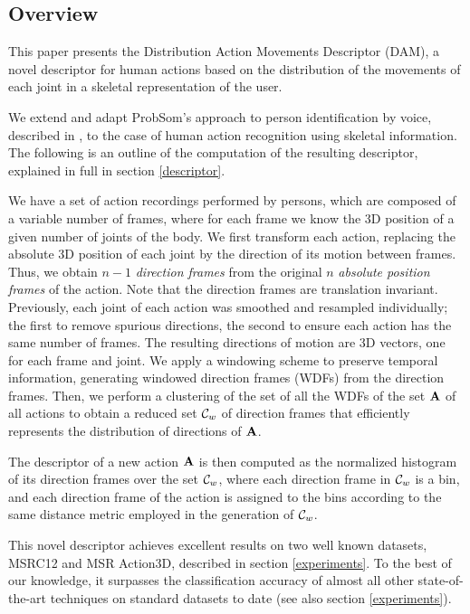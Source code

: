 \documentclass{fcs}
\begin{document}
\subsection{Overview}

This paper presents the Distribution Action Movements Descriptor (DAM), a novel descriptor for human actions based on the distribution of the movements of each joint in a skeletal representation of the user. 

We extend and adapt ProbSom's approach to person identification by voice, described in \cite{Estrebou2010}, to the case of human action recognition using skeletal information. The following is an outline of the computation of the resulting descriptor, explained in full in section \ref{descriptor}. 

We have a set of action recordings performed by persons, which are composed of a variable number of frames, where for each frame we know the 3D position of a given number of joints of the body. We first transform each action, replacing the absolute 3D position of each joint by the direction of its motion between frames. Thus, we obtain $n-1$ \textit{direction frames} from the original $n$ \textit{absolute position frames} of the action. Note that the direction frames are translation invariant. Previously, each joint of each action was smoothed and resampled individually; the first to remove spurious directions, the second to ensure each action has the same number of frames. The resulting directions of motion are 3D vectors, one for each frame and joint. We apply a windowing scheme to preserve temporal information, generating windowed direction frames (WDFs) from the direction frames. Then, we perform a clustering of the set of all the WDFs of the set $\mathbf{A}$ of all actions to obtain a reduced set $\mathcal{C}_w$ of direction frames that efficiently represents the distribution of directions of $\mathbf{A}$. 

The descriptor of a new action $\mathbf{A}$ is then computed as the normalized histogram of its direction frames over the set $\mathcal{C}_w$, where each direction frame in  $\mathcal{C}_w$ is a bin, and each direction frame of the action is assigned to the bins according to the same distance metric employed in the generation of  $\mathcal{C}_w$.

This novel descriptor achieves excellent results on two well known datasets, MSRC12 and MSR Action3D, described in section \ref{experiments}. To the best of our knowledge, it surpasses the classification accuracy of almost all other state-of-the-art techniques on standard datasets to date (see also section \ref{experiments}).
\end{document}
